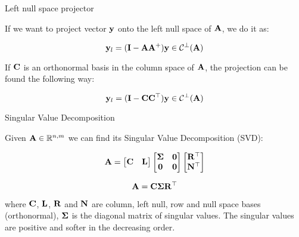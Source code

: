 \documentclass{beamer}
\begin{document}
\begin{frame}{Left null space projector}
	\begin{flushleft}
		
		If we want to project vector $\mathbf{y}$ onto the left null space of $\mathbf{A}$, we do it as:
		
		\begin{equation}
			\mathbf{y}_l = (\mathbf{I} - \mathbf{A}\mathbf{A}^+) \mathbf{y} \in \mathcal{C}^\perp(\mathbf{A})
		\end{equation}
		
		If $\mathbf{C}$ is an orthonormal basis in the column space of $\mathbf{A}$, the projection can be found the following way:
		
		\begin{equation}
			\mathbf{y}_l = (\mathbf{I} - \mathbf{C}\mathbf{C}^\top) \mathbf{y} \in \mathcal{C}^\perp(\mathbf{A})
		\end{equation}
		
		
	\end{flushleft}
\end{frame}



\begin{frame}{Singular Value Decomposition}
	\begin{flushleft}
		
		Given $\mathbf{A} \in \mathbb{R}^{n, m}$ we can find its Singular Value Decomposition (SVD):
		
		\begin{equation}
			\mathbf{A} = 
			\begin{bmatrix}
				\mathbf{C} & \mathbf{L}
			\end{bmatrix}
			\begin{bmatrix}
				\mathbf{\Sigma} & \mathbf{0} \\
				\mathbf{0} & \mathbf{0}
			\end{bmatrix}
			\begin{bmatrix}
				\mathbf{R}^\top \\ \mathbf{N}^\top
			\end{bmatrix}
		\end{equation}
		
		\begin{equation}
			\mathbf{A} = 
			\mathbf{C} \mathbf{\Sigma} \mathbf{R}^\top
		\end{equation}
		
		where $\mathbf{C}$, $\mathbf{L}$, $\mathbf{R}$ and $\mathbf{N}$ are column, left null, row and null space bases (orthonormal), $\mathbf{\Sigma}$ is the diagonal matrix of singular values. The singular values are positive and softer in the decreasing order.
		
		
	\end{flushleft}
\end{frame}
\end{document}
